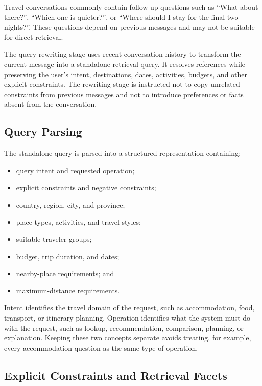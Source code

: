 Travel conversations commonly contain follow-up questions such as ``What about
there?'', ``Which one is quieter?'', or ``Where should I stay for the final two
nights?''. These questions depend on previous messages and may not be suitable
for direct retrieval.

The query-rewriting stage uses recent conversation history to transform the
current message into a standalone retrieval query. It resolves references while
preserving the user's intent, destinations, dates, activities, budgets, and
other explicit constraints. The rewriting stage is instructed not to copy
unrelated constraints from previous messages and not to introduce preferences
or facts absent from the conversation.

\subsection{Query Parsing}

The standalone query is parsed into a structured representation containing:

\begin{itemize}
    \item query intent and requested operation;
    \item explicit constraints and negative constraints;
    \item country, region, city, and province;
    \item place types, activities, and travel styles;
    \item suitable traveler groups;
    \item budget, trip duration, and dates;
    \item nearby-place requirements; and
    \item maximum-distance requirements.
\end{itemize}

Intent identifies the travel domain of the request, such as accommodation,
food, transport, or itinerary planning. Operation identifies what the system
must do with the request, such as lookup, recommendation, comparison, planning,
or explanation. Keeping these two concepts separate avoids treating, for
example, every accommodation question as the same type of operation.

\subsection{Explicit Constraints and Retrieval Facets}

